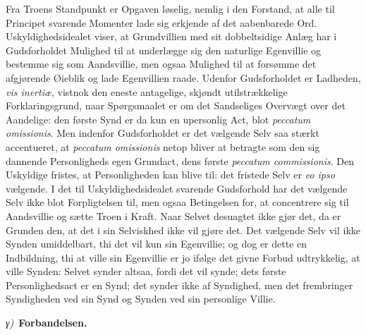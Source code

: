 \documentclass[12pt]{book}
\newcommand{\greekrun}[2]{%
  \medskip\begin{center}{\itshape #1)}\ {\bfseries #2}\end{center}\medskip}
\begin{document}
Fra Troens Standpunkt er Opgaven løselig, nemlig i den Forstand, at
alle til Principet svarende Momenter lade sig erkjende af det
aabenbarede Ord. Uskyldighedsidealet viser, at Grundvillien med sit
dobbeltsidige Anlæg har i Gudsforholdet Mulighed til at underlægge
sig den naturlige Egenvillie og bestemme sig som Aandsvillie, men
ogsaa Mulighed til at forsømme det afgjørende Øieblik og lade
Egenvillien raade. Udenfor Gudsforholdet er Ladheden, \textit{vis
inertiæ}, vistnok den eneste antagelige, skjøndt utilstrækkelige
Forklaringsgrund, naar Spørgsmaalet er om det Sandseliges Overvægt
over det Aandelige: den første Synd er da kun en upersonlig Act,
blot \textit{peccatum omissionis}. Men indenfor Gudsforholdet er det
vælgende Selv saa stærkt accentueret, at \textit{peccatum omissionis}
netop bliver at betragte som den sig dannende Personligheds egen
Grundact, dens første \textit{peccatum commissionis}. Den Uskyldige
fristes, at Personligheden kan blive til: det fristede Selv er
\textit{eo ipso} vælgende. I det til Uskyldighedsidealet svarende
Gudsforhold har det vælgende Selv ikke blot Forpligtelsen til, men
ogsaa Betingelsen for, at concentrere sig til Aandsvillie og sætte
Troen i Kraft. Naar Selvet desuagtet ikke gjør det, da er Grunden
den, at det i sin Selviskhed ikke vil gjøre det. Det vælgende
Selv vil ikke Synden umiddelbart, thi det vil kun sin Egenvillie; og
dog er dette en Indbildning, thi at ville sin Egenvillie er jo
ifølge det givne Forbud udtrykkelig, at ville Synden: Selvet synder
altsaa, fordi det vil synde; dets første Personlighedsact er en
Synd; det synder ikke af Syndighed, men det frembringer Syndigheden
ved sin Synd og Synden ved sin personlige Villie.

\greekrun{γ}{Forbandelsen.}
\end{document}
